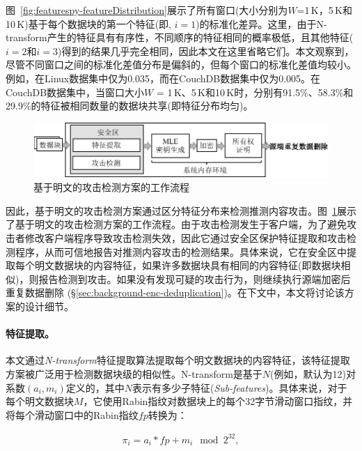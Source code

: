 图~\ref{fig:featurespy-featureDistribution}展示了所有窗口(大小分别为$W$=1\,K，5\,K和10\,K)基于每个数据块的第一个特征(即, $i = 1$)的标准化差异。这里，由于N-transform产生的特征具有有序性，不同顺序的特征相同的概率极低，且其他特征($i = 2$和$i = 3$)得到的结果几乎完全相同，因此本文在这里省略它们。本文观察到，尽管不同窗口之间的标准化差值分布是偏斜的，但每个窗口的标准化差值均较小。例如，在Linux数据集中仅为0.035，而在CouchDB数据集中仅为0.005。在CouchDB数据集中，当窗口大小$W$ = 1\,K、5\,K和10\,K时，分别有91.5\%、58.3\%和29.9\%的特征被相同数量的数据块共享(即特征分布均匀)。

\begin{figure}[!htb]
    \centering
    \includegraphics[width=\textwidth]{pic/featurespy/naive.pdf}
    \caption{基于明文的攻击检测方案的工作流程}
    \label{fig:featurespy-architecture-strawman}
\end{figure}

因此，基于明文的攻击检测方案通过区分特征分布来检测推测内容攻击。图~\ref{fig:featurespy-architecture-strawman}展示了基于明文的攻击检测方案的工作流程。由于攻击检测发生于客户端，为了避免攻击者修改客户端程序导致攻击检测失效，因此它通过安全区保护特征提取和攻击检测程序，从而可信地报告对推测内容攻击的检测结果。具体来说，它在安全区中提取每个明文数据块的内容特征，如果许多数据块具有相同的内容特征(即数据块相似)，则报告检测到攻击。如果没有发现可疑的攻击行为，则继续执行源端加密后重复数据删除 (\S\ref{sec:background-enc-deduplication})。在下文中，本文将讨论该方案的设计细节。

\paragraph*{特征提取。}
本文通过\textit{N-transform}\cite{shilane12}特征提取算法提取每个明文数据块的内容特征，该特征提取方案被广泛用于检测数据块级的相似性。N-transform是基于$N$(例如，默认为12)对系数$(a_i, m_i)$定义的，其中$N$表示有多少子特征(\textit{Sub-features})。具体来说，对于每个明文数据块$M$，它使用Rabin指纹\cite{rabin81}对数据块上的每个32字节滑动窗口指纹，并将每个滑动窗口中的Rabin指纹$fp$转换为：

\begin{eqnarray}
    \label{eq:featurespy-feature}
    \pi_i = a_i * fp + m_i \mod 2^{32},
\end{eqnarray}

